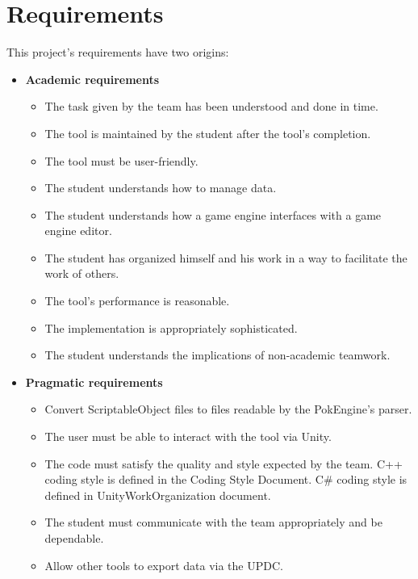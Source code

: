 \documentclass[12pt,a4paper]{article}
\begin{document}
\section{Requirements}
This project’s requirements have two origins:
\begin{itemize}
	\item \textbf{Academic requirements}
		\begin{itemize}
			\item The task given by the team has been understood and done in time.
			
			\item The tool is maintained by the student after the tool's completion.
			
			\item The tool must be user-friendly.
			
			\item The student understands how to manage data.
			
			\item The student understands how a game engine interfaces with a game engine editor.
			
			\item The student has organized himself and his work in a way to facilitate the work of others.
			
			\item The tool’s performance is reasonable.
			
			\item The implementation is appropriately sophisticated.
			
			\item The student understands the implications of non-academic teamwork.
			
		\end{itemize}
	\item \textbf{Pragmatic requirements}
		\begin{itemize}
			\item Convert ScriptableObject files to files readable by the PokEngine's parser.
			
			\item The user must be able to interact with the tool via Unity.
			
			\item The code must satisfy the quality and style expected by the team. C++ coding style is defined in the Coding Style Document. C\# coding style is defined in UnityWorkOrganization document.
			
			\item The student must communicate with the team appropriately and be dependable.
			
			\item Allow other tools to export data via the UPDC.
			
	\end{itemize}
\end{itemize}
\newpage
\end{document}
